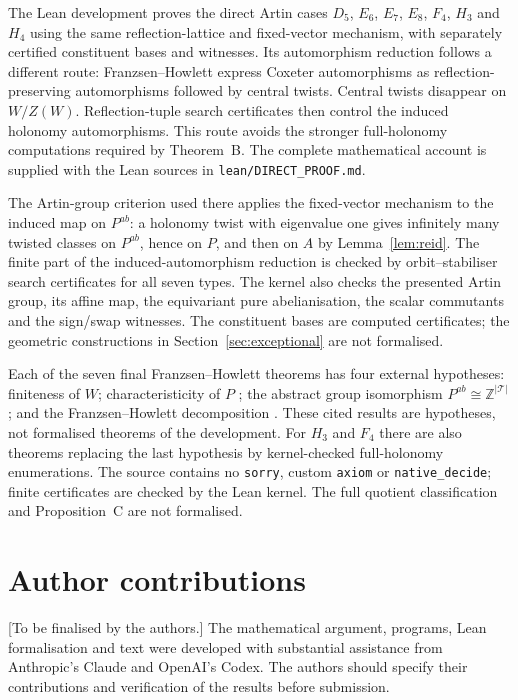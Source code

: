 \documentclass[11pt]{amsart}
\theoremstyle{definition}
\newcommand{\Z}{\mathbb{Z}}
\newcommand{\T}{\mathcal{T}}
\begin{document}
The Lean development proves the direct Artin cases
$D_5$, $E_6$, $E_7$, $E_8$, $F_4$, $H_3$ and $H_4$ using the same reflection-lattice and fixed-vector
mechanism, with separately certified constituent bases and witnesses. Its automorphism reduction follows a different route:
Franzsen--Howlett \cite[Thm.~31]{FH03} express Coxeter automorphisms as reflection-preserving
automorphisms followed by central twists. Central twists disappear on $W/Z(W)$.
Reflection-tuple search certificates then control the induced holonomy automorphisms.
This route avoids the stronger full-holonomy computations required by Theorem~B.
The complete mathematical account is supplied with the Lean sources in
\texttt{lean/DIRECT\_PROOF.md}.

The Artin-group criterion used there applies the fixed-vector mechanism to the induced map
on $P^{ab}$: a holonomy twist with eigenvalue one gives infinitely many twisted classes on
$P^{ab}$, hence on $P$, and then on $A$ by Lemma~\ref{lem:reid}.
The finite part of the induced-automorphism reduction is checked by orbit--stabiliser search
certificates for all seven types. The kernel also checks the presented Artin group, its affine map,
the equivariant pure abelianisation, the scalar commutants and the sign/swap witnesses.
The constituent bases are computed certificates; the geometric constructions in
Section~\ref{sec:exceptional} are not formalised.

Each of the seven final Franzsen--Howlett theorems has four external hypotheses:
finiteness of $W$; characteristicity of $P$ \cite{CP03};
the abstract group isomorphism $P^{ab}\cong\Z^{|\T|}$ \cite{Bri71}; and the
Franzsen--Howlett decomposition \cite[Thm.~31]{FH03}.
These cited results are hypotheses, not formalised theorems of the development.
For $H_3$ and $F_4$ there are also theorems replacing the last hypothesis by kernel-checked
full-holonomy enumerations. The source contains no \texttt{sorry}, custom \texttt{axiom}
or \texttt{native\_decide}; finite certificates are checked by the Lean kernel.
The full quotient classification and Proposition~C are not formalised.

\section*{Author contributions}
[To be finalised by the authors.] The mathematical argument, programs, Lean formalisation and text
were developed with substantial assistance from Anthropic's Claude and OpenAI's Codex.
The authors should specify their contributions and verification of the results before submission.
\end{document}
